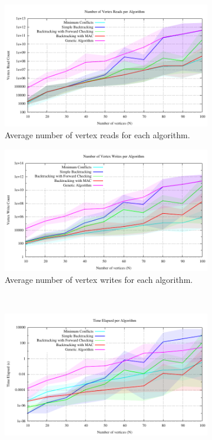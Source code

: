 \documentclass{article}
\begin{document}
		\begin{figure}[h!]
			\centering
			\begin{subfigure}{0.49\textwidth}
				\centering
				\includegraphics[width=\textwidth]{../results_5/comparing_read_performance}
				\caption{Average number of vertex reads for each algorithm.}
			\end{subfigure}
			\;
			\begin{subfigure}{0.49\textwidth}
				\centering
				\includegraphics[width=\textwidth]{../results_5/comparing_write_performance}
				\caption{Average number of vertex writes for each algorithm.}
			\end{subfigure} 
			\\
			\begin{subfigure}{0.49\textwidth}
				\centering
				\includegraphics[width=\textwidth]{../results_5/comparing_time_performance}

\end{subfigure}
\end{figure}
\end{document}
